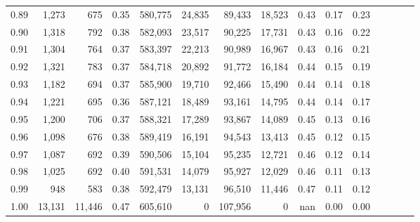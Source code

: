 \begin{tabular}{rrrcrrrrrrrrrrr}
0.89 &   1,273 &     675 &                                       0.35 &  580,775 &   24,835 &   89,433 &   18,523 &  0.43 &  0.17 &                         0.23 \\
0.90 &   1,318 &     792 &                                       0.38 &  582,093 &   23,517 &   90,225 &   17,731 &  0.43 &  0.16 &                         0.22 \\
0.91 &   1,304 &     764 &                                       0.37 &  583,397 &   22,213 &   90,989 &   16,967 &  0.43 &  0.16 &                         0.21 \\
0.92 &   1,321 &     783 &                                       0.37 &  584,718 &   20,892 &   91,772 &   16,184 &  0.44 &  0.15 &                         0.19 \\
0.93 &   1,182 &     694 &                                       0.37 &  585,900 &   19,710 &   92,466 &   15,490 &  0.44 &  0.14 &                         0.18 \\
0.94 &   1,221 &     695 &                                       0.36 &  587,121 &   18,489 &   93,161 &   14,795 &  0.44 &  0.14 &                         0.17 \\
0.95 &   1,200 &     706 &                                       0.37 &  588,321 &   17,289 &   93,867 &   14,089 &  0.45 &  0.13 &                         0.16 \\
0.96 &   1,098 &     676 &                                       0.38 &  589,419 &   16,191 &   94,543 &   13,413 &  0.45 &  0.12 &                         0.15 \\
0.97 &   1,087 &     692 &                                       0.39 &  590,506 &   15,104 &   95,235 &   12,721 &  0.46 &  0.12 &                         0.14 \\
0.98 &   1,025 &     692 &                                       0.40 &  591,531 &   14,079 &   95,927 &   12,029 &  0.46 &  0.11 &                         0.13 \\
0.99 &     948 &     583 &                                       0.38 &  592,479 &   13,131 &   96,510 &   11,446 &  0.47 &  0.11 &                         0.12 \\
1.00 &  13,131 &  11,446 &                                       0.47 &  605,610 &        0 &  107,956 &        0 &   nan &  0.00 &                         0.00 \\
\bottomrule
\end{tabular}
